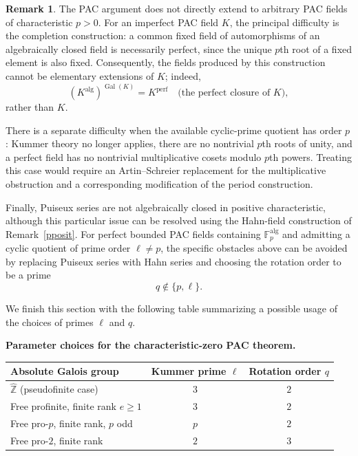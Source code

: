 \documentclass[10pt,a4paper]{amsart}
\renewcommand{\ge}{\geqslant}
\theoremstyle{definition}
\newtheorem{remark}[theorem]{Remark}
\newcommand{\Z}{\mathbb Z}
\newcommand{\alg}{\mathrm{alg}}
\DeclareMathOperator{\Gal}{Gal}
\begin{document}
\begin{remark}\label{nop}
The PAC argument does not directly extend to arbitrary PAC fields
of characteristic $p>0$. For an imperfect PAC field $K$, the
principal difficulty is the completion construction: a common
fixed field of automorphisms of an algebraically closed field
is necessarily perfect, since the unique $p$th root of a fixed
element is also fixed. Consequently, the fields produced by
this construction cannot be elementary extensions of $K$;
indeed,
\[
\left(K^{\alg}\right)^{\Gal(K)}=K^{\mathrm{perf}}\quad \text{(the perfect closure of $K$)},
\]
rather than $K$.

There is a separate difficulty when the available cyclic-prime
quotient has order $p$: Kummer theory no longer applies, there
are no nontrivial $p$th roots of unity, and a perfect field has
no nontrivial multiplicative cosets modulo $p$th powers.
Treating this case would require an Artin--Schreier replacement
for the multiplicative obstruction and a corresponding
modification of the period construction.

Finally, Puiseux series are not algebraically closed in positive
characteristic, although this particular issue can be resolved
using the Hahn-field construction of Remark~\ref{pposit}.
For perfect bounded PAC fields containing
$\mathbb F_p^\alg$ and admitting a cyclic quotient of
prime order $\ell\ne p$, the specific obstacles above can be
avoided by replacing Puiseux series with Hahn series and choosing
the rotation order to be a prime
\[
q\notin\{p,\ell\}.
\]
\end{remark}
We finish this section with the following table summarizing a possible usage of the choices of primes $\ell$ and $q$.
\begin{center}
\small
\textbf{Parameter choices for the characteristic-zero PAC theorem.}
\par\smallskip
\renewcommand{\arraystretch}{1.2}
\begin{tabular}{@{}p{}cc@{}}
\toprule
Absolute Galois group & Kummer prime $\ell$ & Rotation order $q$\\
\midrule
$\widehat{\Z}$ (pseudofinite case) & $3$ & $2$\\
Free profinite, finite rank $e\ge1$ & $3$ & $2$\\
Free pro-$p$, finite rank, $p$ odd & $p$ & $2$\\
Free pro-$2$, finite rank & $2$ & $3$\\
\bottomrule
\end{tabular}
\end{center}
\end{document}

